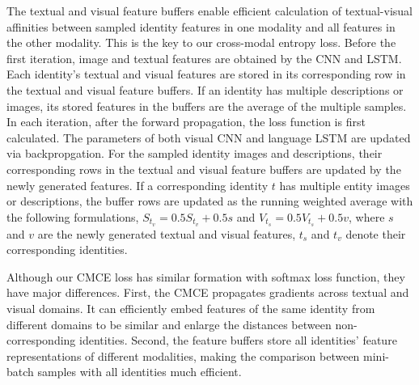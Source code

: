 The textual and visual feature buffers enable efficient calculation of textual-visual affinities between sampled identity features in one modality and all features in the other modality. This is the key to our cross-modal entropy loss.
Before the first iteration, image and textual features are obtained by the CNN and LSTM. Each identity's textual and visual features are stored in its corresponding row in the textual and visual feature buffers. If an identity has multiple descriptions or images, its stored features in the buffers are the average of the multiple samples. In each iteration, after the forward propagation, the loss function is first calculated. The parameters of both visual CNN and language LSTM are updated via backpropgation. For the sampled identity images and descriptions, their corresponding rows in the textual and visual feature buffers are updated by the newly generated features. If a corresponding identity $t$ has multiple entity images or descriptions, the buffer rows are updated as the running weighted average with the following formulations, $S_{t_v} = 0.5 S_{t_v} + 0.5 s$ and $V_{t_s} = 0.5 V_{t_s} + 0.5 v$, where $s$ and $v$ are the newly generated textual and visual features, $t_s$ and $t_v$ denote their corresponding identities.

Although our CMCE loss has similar formation with softmax loss function, they have major differences. First, the CMCE propagates gradients across textual and visual domains. It can efficiently embed features of the same identity from different domains to be similar and enlarge the distances between non-corresponding identities. Second, the feature buffers store all identities' feature representations of different modalities, making the comparison between mini-batch samples with all identities much efficient.

